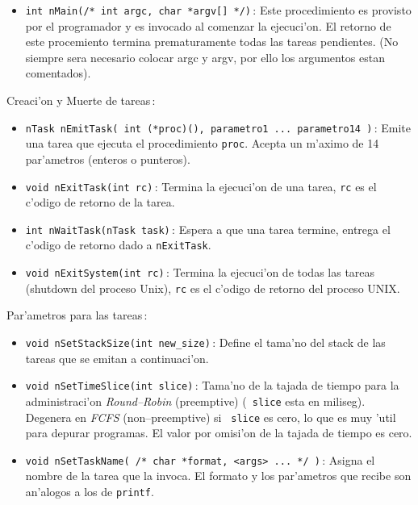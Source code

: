 \begin{itemize}

\item {\tt int nMain(/* int argc, char *argv[] */)}\,:  Este procedimiento es
provisto por el programador y es invocado al comenzar la ejecuci'on.
El retorno de este procemiento termina prematuramente todas las tareas
pendientes. (No siempre sera necesario colocar argc y argv, por ello
los argumentos estan comentados).

\end{itemize}

Creaci'on y Muerte de tareas\,:

\begin{itemize}

\item {\tt nTask nEmitTask( int (*proc)(), parametro1 ... parametro14 )}\,:
Emite una tarea que ejecuta el procedimiento {\tt proc}. Acepta un
m'aximo de 14 par'ametros (enteros o punteros).

\item
{\tt void nExitTask(int rc)}\,:
Termina la ejecuci'on de una tarea,
{\tt rc} es el c'odigo de retorno de la tarea.

\item
{\tt int   nWaitTask(nTask task)}\,:
Espera a que una tarea termine,
entrega el c'odigo de retorno dado a {\tt nExitTask}.

\item
{\tt void nExitSystem(int rc)}\,:
Termina la ejecuci'on de todas las tareas (shutdown del proceso Unix),
{\tt rc} es el c'odigo de retorno del proceso UNIX.

\end{itemize}

Par'ametros para las tareas\,:

\begin{itemize}

\item
{\tt void nSetStackSize(int new\_size)}\,:
Define el tama'no del stack de las tareas que se emitan a continuaci'on.

\item
{\tt void nSetTimeSlice(int slice)}\,: Tama'no de la tajada de tiempo
para la administraci'on {\em Round--Robin} (preemptive) ({\tt
slice} esta en miliseg).  Degenera en {\em FCFS} (non--preemptive) si {\tt
slice} es cero, lo que es muy 'util para depurar programas. El valor
por omisi'on de la tajada de tiempo es cero.

\item
{\tt void nSetTaskName( /* char *format, <args> ... */ )}\,:
Asigna el nombre de la tarea que la invoca.
El formato y los par'ametros que recibe son an'alogos a los de {\tt printf}.

\end{itemize}

